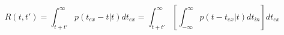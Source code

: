 \begin{equation}
R(t,t') = \int_{t+t'}^\infty p(t_{ex}-t|t) dt_{ex}  = \int_{t+t'}^\infty \left[ \int_{-\infty}^\infty p(t-t_{ex}|t) dt_{in}\right]  dt_{ex}
\end{equation}